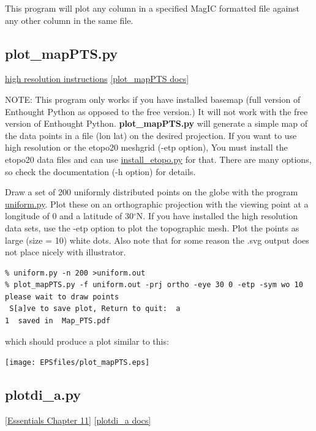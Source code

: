\documentclass[11pt]{book}
\begin{document}
{{  This program will plot any column in a specified MagIC formatted file against any other column in the same file.


  \subsection{plot\_mapPTS.py}
  \href{#hires}{high resolution instructions}
  \href{https://github.com/PmagPy/PmagPy/blob/master/programs/plot_mapPTS.py}{[plot\_mapPTS docs]}

NOTE:  This program only works if you have installed basemap (full version of Enthought Python as opposed to the free version.)  It will not work with the free version of Enthought Python.  {\bf plot\_mapPTS.py} will generate a simple map of the data points in a file (lon lat) on the desired projection.
If you want to use high resolution or the etopo20 meshgrid (-etp option), You must install the etopo20 data files and can use \href{#install_etopo.py}{install\_etopo.py}  for that.
 There are many options, so check the documentation (-h option) for details.

Draw a set of 200 uniformly distributed points on the globe with the program \href{#uniform.py}{uniform.py}.  Plot these on an orthographic projection with the viewing point at a longitude of 0 and a latitude of 30$^{\circ}$N.  If you have installed the high resolution data sets, use the -etp option to plot the topographic mesh.  Plot the points as large (size = 10) white dots.  Also note that for some reason the .svg output does not place nicely with illustrator.

\begin{verbatim}
% uniform.py -n 200 >uniform.out
% plot_mapPTS.py -f uniform.out -prj ortho -eye 30 0 -etp -sym wo 10
please wait to draw points
 S[a]ve to save plot, Return to quit:  a
1  saved in  Map_PTS.pdf
\end{verbatim}

which should produce a plot similar to this:

\texttt{[image: EPSfiles/plot\_mapPTS.eps]}





\subsection{plotdi\_a.py}
\href{http://earthref.org/MAGIC/books/Tauxe/Essentials/WebBook3ch11.html#ch11}{[Essentials Chapter 11]}
\href{https://github.com/PmagPy/PmagPy/blob/master/programs/plotdi_a.py}{[plotdi\_a docs]}

}}
\end{document}

